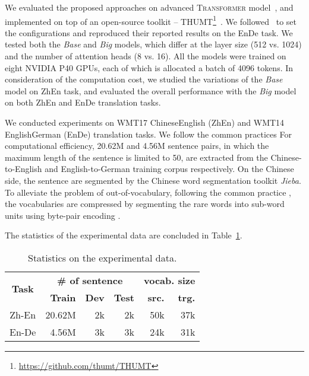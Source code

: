 \documentclass[11pt,a4paper]{article}
\begin{document}
We evaluated the proposed approaches on advanced \textsc{Transformer} model~\cite{Vaswani:2017:NIPS}, and implemented on top of an open-source toolkit -- THUMT\footnote{\url{https://github.com/thumt/THUMT}}~\cite{zhang2017thumt}. We followed~ to set the configurations and reproduced their reported results on the EnDe task.
We tested both the \emph{Base} and \emph{Big} models, which differ at the layer size (512 vs. 1024) and the number of attention heads (8 vs. 16). All the models were trained on eight NVIDIA P40 GPUs, each of which is allocated a batch of 4096 tokens.  In consideration of the computation cost, we studied the variations of the \emph{Base} model on ZhEn task, and evaluated the overall performance with the \emph{Big} model on both ZhEn and EnDe translation tasks.






\iffalse 
We conducted experiments on WMT17 ChineseEnglish (ZhEn) and WMT14 EnglishGerman (EnDe) translation tasks. 
We follow the common practices 
For computational efficiency, 20.62M and 4.56M sentence pairs, in which the maximum length of the sentence is limited to 50, are extracted from the Chinese-to-English and English-to-German training corpus respectively. On the Chinese side, the sentence are segmented by the Chinese word segmentation toolkit {\em Jieba}. To alleviate the problem of out-of-vocabulary, following the common practice \cite{sennrich2015neural,hassan2018achieving}, the vocabularies are compressed by segmenting the rare words into sub-word units using byte-pair encoding \cite{gage1994new}. 

The statistics of the experimental data are concluded in Table~\ref{tab:statistic}.
\begin{table}[ht]
	\begin{center}
		\begin{tabular}{c||r|r|r|r|r}
		    \multirow{2}{*}{\textbf{Task}}  & \multicolumn{3}{c|}{\textbf{\# of sentence}}                                     &  \multicolumn{2}{c}{\textbf{vocab. size}} \\ \cline{2-6}
				& \textbf{Train}   & 	\textbf{Dev}  & 	\textbf{Test} & \textbf{src.} & \textbf{trg.}  \\ \hline \hline
			Zh-En	  & 20.62M     	   &  2k & 2k &  50k & 37k   \\ 
			En-De    &  4.56M       &  3k  &  3k  & 24k & 31k \\ 
		\end{tabular}
		\caption{Statistics on the experimental data.}
		\label{tab:statistic} 
	\end{center}
\end{table}
\end{document}
